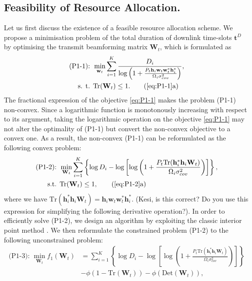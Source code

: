 \documentclass[12pt,draftcls,onecolumn,journal]{IEEEtran}
\begin{document}
\subsection{Feasibility of Resource Allocation.}

Let us first discuss the existence of a feasible resource allocation scheme. We propose a minimisation problem of the total duration of downlink time-slots $\mathbf{t}^D$ by optimising the transmit beamforming matrix $\mathbf{W}_t$, which is formulated as
\begin{align}
	\text{(P1-1): } &\min_{\mathbf{w}_t}\sum_{i=1}^{K} \frac{D_i}{\log\left(1 + \frac{P_t\mathbf{h}_i\mathbf{w}_t\mathbf{w}_t^*\mathbf{h}_i^*}{\Omega_i\sigma_{cov}^2}\right)}, \label{eq:P1-1}\\
	\text{s. t. } &\text{Tr}(\mathbf{W}_t) \leq 1. \tag{\ref{eq:P1-1}a} \label{eq:P1-1-a}
\end{align}
The fractional expression of the objective \eqref{eq:P1-1} makes the problem (P1-1) non-convex. Since a logarithmic function is monotonously increasing with respect to its argument, taking the logarithmic operation on the objective \eqref{eq:P1-1} may not alter the optimality of (P1-1) but convert the non-convex objective to a convex one. As a result, the non-convex (P1-1) can be reformulated as the following convex problem:
\begin{align}
	\text{(P1-2): } & \min_{\mathbf{W}_t}\sum_{i=1}^{K} \left\{ \log D_i - \log\left[\log\left(1 + \frac{P_t\text{Tr} (\mathbf{h}_i^*\mathbf{h}_i\mathbf{W}_t)}{\Omega_i\sigma_{cov}^2}\right)\right]\right\}, \label{eq:P1-2}\\
	\text{s.t. } & \text{Tr}(\mathbf{W}_t) \leq 1, \tag{\ref{eq:P1-2}a} \label{eq:P1-2-a}
\end{align}
where we have $\text{Tr}(\mathbf{h}_i^*\mathbf{h}_i\mathbf{W}_t) = \mathbf{h}_i\mathbf{w}_t\mathbf{w}_t^*\mathbf{h}_i^*$. {\color{red} (Kesi, is this correct? Do you use this expression for simplifying the following derivative operation?)}. In order to efficiently solve (P1-2), we design an algorithm by exploiting the classic interior point method \cite{convex}. We then reformulate the constrained problem (P1-2) to the following unconstrained problem:
\begin{align}
	\text{(P1-3): } \min_{\mathbf{W}_t} f_1(\mathbf{W}_t) &= \sum_{i=1}^{K} \left\{ \log D_i - \log\left[\log\left(1 + \frac{P_t\text{Tr}(\mathbf{h}_i^*\mathbf{h}_i\mathbf{W}_t)}{\Omega_i\sigma_{cov}^2}\right)\right]\right\} \nonumber \\
	&- \phi(1-\text{Tr}(\mathbf{W}_t)) - \phi(\text{Det}(\mathbf{W}_t)), \label{eq:P1-3}
\end{align}
\end{document}
